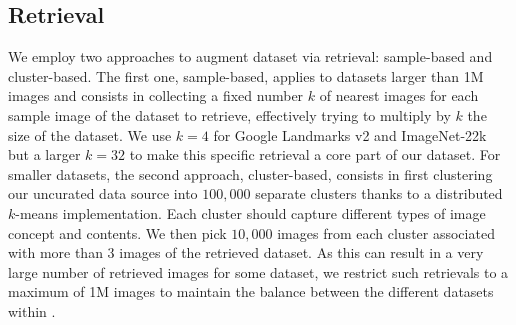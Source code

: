 \subsection{Retrieval}
\label{subsec:supp-data-retrieval}
We employ two approaches to augment dataset via retrieval: sample-based and cluster-based. 
The first one, sample-based, applies to datasets larger than 1M images and consists in collecting a fixed number $k$ of nearest images for each sample image of the dataset to retrieve, effectively trying to multiply by $k$ the size of the dataset. 
We use $k = 4$ for Google Landmarks v2 and ImageNet-22k but a larger $k = 32$ to make this specific retrieval a core part of our \LaViDa{} dataset. 
For smaller datasets, the second approach, cluster-based, consists in first clustering our uncurated data source into $100,000$ separate clusters thanks to a distributed $k$-means implementation. 
Each cluster should capture different types of image concept and contents. 
We then pick $10,000$ images from each cluster associated with more than $3$ images of the retrieved dataset. 
As this can result in a very large number of retrieved images for some dataset, we restrict such retrievals to a maximum of 1M images to maintain the balance between the different datasets within \LaViDa.

